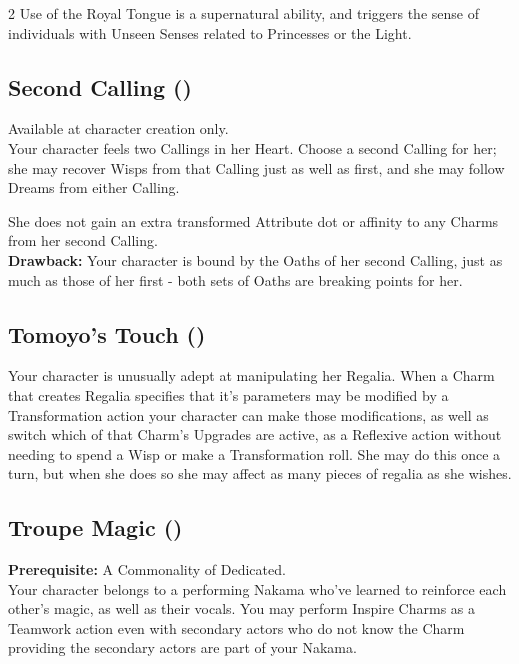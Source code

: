 \begin{multicols}{2}
Use of the Royal Tongue is a supernatural ability, and triggers the sense of individuals with Unseen Senses related to Princesses or the Light.

\subsection*{Second Calling (\textbullet\textbullet)}

Available at character creation only.\\

\noindent Your character feels two Callings in her Heart. Choose a second Calling for her; she may recover Wisps from that Calling just as well as first, and she may follow Dreams from either Calling. 

She does not gain an extra transformed Attribute dot or affinity to any Charms from her second Calling.\\

\noindent \textbf{Drawback:} Your character is bound by the Oaths of her second Calling, just as much as those of her first - both sets of Oaths are breaking points for her.

\subsection*{Tomoyo's Touch (\textbullet)}

Your character is unusually adept at manipulating her Regalia. When a Charm that creates Regalia specifies that it's parameters may be modified by a Transformation action your character can make those modifications, as well as switch which of that Charm's Upgrades are active, as a Reflexive action without needing to spend a Wisp or make a Transformation roll. She may do this once a turn, but when she does so she may affect as many pieces of regalia as she wishes.

\subsection*{Troupe Magic (\textbullet)}

\textbf{Prerequisite:} A Commonality of Dedicated. \\

\noindent Your character belongs to a performing Nakama who've learned to reinforce each other’s magic, as well as their vocals. You may perform Inspire Charms as a Teamwork action even with secondary actors who do not know the Charm providing the secondary actors are part of your Nakama. 


\end{multicols}
